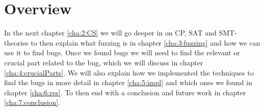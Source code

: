 \section{Overview}
In the next chapter \ref{cha:2:CS} we will go deeper in on CP, SAT and SMT-theories to then explain what fuzzing is in chapter \ref{cha:3:fuzzing} and how we can use it to find bugs. Once we found bugs we will need to find the relevant or crucial part related to the bug, which we will discuss in chapter \ref{cha:4:crucialParts}. We will also explain how we implemented the techniques to find the bugs in more detail in chapter \ref{cha:5:impl} and which ones we found in chapter \ref{cha:6:res}. To then end with a conclusion and future work in chapter \ref{cha:7:conclusion}.


